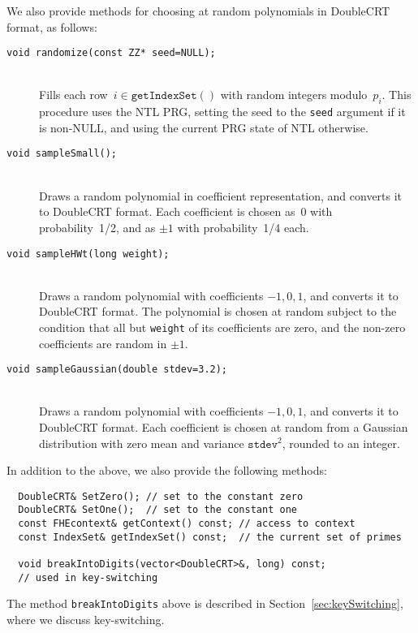 \documentclass[14pt]{extarticle}
\newcommand{\shaisays}[1]{$\ll$\textsf{#1 Shai}$\gg$}
\newcommand{\secref}[1]{Section~\protect\ref{sec:#1}}
\def\DoubleCRT{\textsf{DoubleCRT}}
\begin{document}
\noindent
We also provide methods for choosing at random polynomials in
{\DoubleCRT} format, as follows:

\begin{description}
\item[\texttt{void randomize(const ZZ* seed=NULL);}]\ \\
Fills each row~$i\in\mathtt{getIndexSet()}$ with random integers 
modulo~$p_i$. This procedure uses the NTL PRG, setting the seed
to the \texttt{seed} argument if it is non-NULL, and using the
current PRG state of NTL otherwise.

\item[\texttt{void sampleSmall();}]\ \\
Draws a random polynomial in coefficient representation, and converts
it to {\DoubleCRT} format. Each coefficient is chosen as~0 with
probability~1/2,  and as $\pm 1$ with probability~1/4 each.


\item[\texttt{void sampleHWt(long weight);}]\ \\
Draws a random polynomial with coefficients $-1,0,1$, and converts
it to {\DoubleCRT} format. The polynomial is chosen at random subject
to the condition that all but \texttt{weight} of its coefficients
are zero, and the non-zero coefficients are random in $\pm 1$.

\item[\texttt{void sampleGaussian(double stdev=3.2);}]\ \\
Draws a random polynomial with coefficients $-1,0,1$, and converts
it to {\DoubleCRT} format. Each coefficient is chosen at random from
a Gaussian distribution with zero mean and variance $\mathtt{stdev}^2$,
rounded to an integer.
\end{description}

\noindent
In addition to the above, we also provide the following methods:
\begin{verbatim}
  DoubleCRT& SetZero(); // set to the constant zero
  DoubleCRT& SetOne();  // set to the constant one
  const FHEcontext& getContext() const; // access to context
  const IndexSet& getIndexSet() const;  // the current set of primes

  void breakIntoDigits(vector<DoubleCRT>&, long) const; 
  // used in key-switching
\end{verbatim}
The method \texttt{breakIntoDigits} above is described in
\secref{keySwitching}, where we discuss key-switching.
\end{document}
